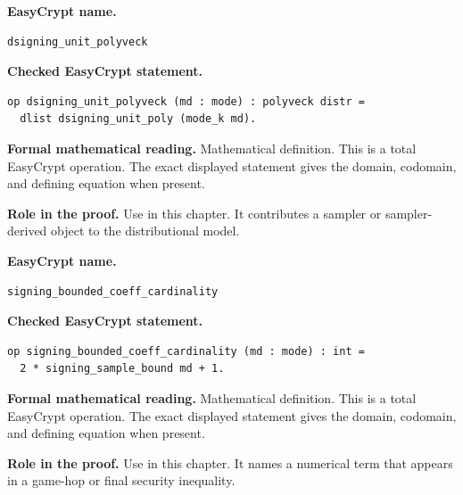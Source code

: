 \begin{formaldefinition}
\noindent\textbf{EasyCrypt name.}
\begin{lstlisting}[language=EasyCrypt,basicstyle=\ttfamily\scriptsize]
dsigning_unit_polyveck
\end{lstlisting}
\noindent\textbf{Checked EasyCrypt statement.}
\begin{lstlisting}[language=EasyCrypt,basicstyle=\ttfamily\scriptsize]
op dsigning_unit_polyveck (md : mode) : polyveck distr =
  dlist dsigning_unit_poly (mode_k md).
\end{lstlisting}
\noindent\textbf{Formal mathematical reading.}
Mathematical definition. This is a total EasyCrypt operation.  The exact displayed statement gives the domain, codomain, and defining equation when present.

\noindent\textbf{Role in the proof.}
Use in this chapter. It contributes a sampler or sampler-derived object to the distributional model.

\end{formaldefinition}

\begin{formaldefinition}
\noindent\textbf{EasyCrypt name.}
\begin{lstlisting}[language=EasyCrypt,basicstyle=\ttfamily\scriptsize]
signing_bounded_coeff_cardinality
\end{lstlisting}
\noindent\textbf{Checked EasyCrypt statement.}
\begin{lstlisting}[language=EasyCrypt,basicstyle=\ttfamily\scriptsize]
op signing_bounded_coeff_cardinality (md : mode) : int =
  2 * signing_sample_bound md + 1.
\end{lstlisting}
\noindent\textbf{Formal mathematical reading.}
Mathematical definition. This is a total EasyCrypt operation.  The exact displayed statement gives the domain, codomain, and defining equation when present.

\noindent\textbf{Role in the proof.}
Use in this chapter. It names a numerical term that appears in a game-hop or final security inequality.

\end{formaldefinition}

